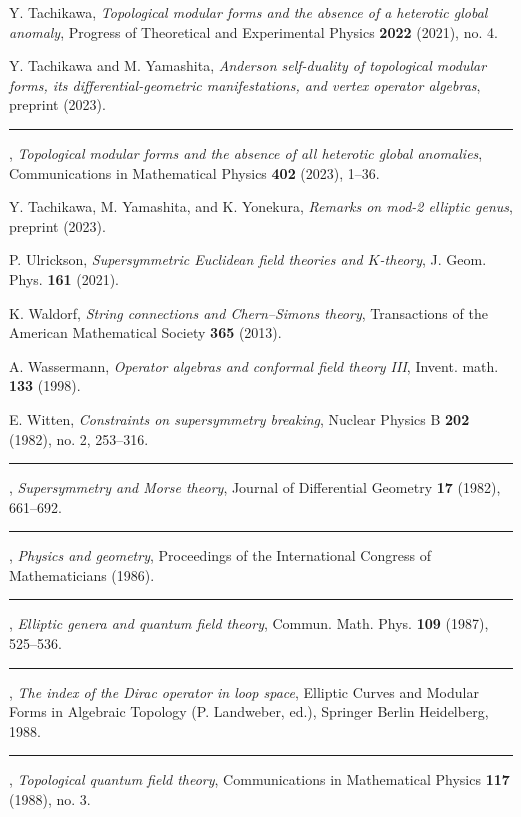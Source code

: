 \begin{description}[leftmargin=5.6em,labelwidth=5.2em,labelsep=0.4em,itemsep=0.5ex,parsep=0pt,topsep=0.8ex]
\item[\textbf{[Tac21]}] Y. Tachikawa, \textit{Topological modular forms and the absence of a heterotic global anomaly}, Progress of Theoretical and Experimental Physics \textbf{2022} (2021), no. 4.
\item[\textbf{[TY23a]}] Y. Tachikawa and M. Yamashita, \textit{Anderson self-duality of topological modular forms, its differential-geometric manifestations, and vertex operator algebras}, preprint (2023).
\item[\textbf{[TY23b]}] \rule[0.45ex]{2.6em}{0.45pt}, \textit{Topological modular forms and the absence of all heterotic global anomalies}, Communications in Mathematical Physics \textbf{402} (2023), 1--36.
\item[\textbf{[TYY23]}] Y. Tachikawa, M. Yamashita, and K. Yonekura, \textit{Remarks on mod-2 elliptic genus}, preprint (2023).
\item[\textbf{[Ulr21]}] P. Ulrickson, \textit{Supersymmetric Euclidean field theories and $K$-theory}, J. Geom. Phys. \textbf{161} (2021).
\item[\textbf{[Wal13]}] K. Waldorf, \textit{String connections and Chern--Simons theory}, Transactions of the American Mathematical Society \textbf{365} (2013).
\item[\textbf{[Was98]}] A. Wassermann, \textit{Operator algebras and conformal field theory III}, Invent. math. \textbf{133} (1998).
\item[\textbf{[Wit82a]}] E. Witten, \textit{Constraints on supersymmetry breaking}, Nuclear Physics B \textbf{202} (1982), no. 2, 253--316.
\item[\textbf{[Wit82b]}] \rule[0.45ex]{2.6em}{0.45pt}, \textit{Supersymmetry and Morse theory}, Journal of Differential Geometry \textbf{17} (1982), 661--692.
\item[\textbf{[Wit86]}] \rule[0.45ex]{2.6em}{0.45pt}, \textit{Physics and geometry}, Proceedings of the International Congress of Mathematicians (1986).
\item[\textbf{[Wit87]}] \rule[0.45ex]{2.6em}{0.45pt}, \textit{Elliptic genera and quantum field theory}, Commun. Math. Phys. \textbf{109} (1987), 525--536.
\item[\textbf{[Wit88a]}] \rule[0.45ex]{2.6em}{0.45pt}, \textit{The index of the Dirac operator in loop space}, Elliptic Curves and Modular Forms in Algebraic Topology (P. Landweber, ed.), Springer Berlin Heidelberg, 1988.
\item[\textbf{[Wit88b]}] \rule[0.45ex]{2.6em}{0.45pt}, \textit{Topological quantum field theory}, Communications in Mathematical Physics \textbf{117} (1988), no. 3.

\end{description}
